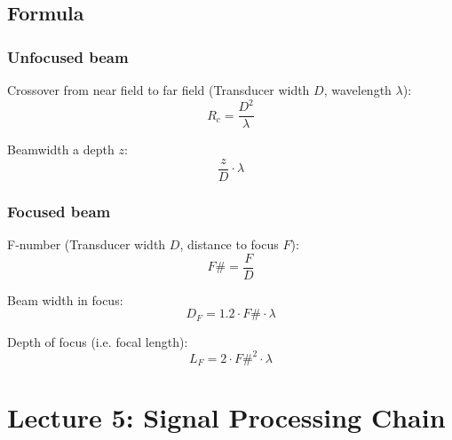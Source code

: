 \documentclass[10pt,a4paper,noendnumber=true]{scrartcl}
\begin{document}
\subsection{Formula}
\subsubsection{Unfocused beam}
Crossover from near field to far field (Transducer width $D$, wavelength $\lambda$):
\begin{equation}
R_c = \frac{D^2}{\lambda}
\end{equation}

Beamwidth a depth $z$:
\begin{equation}
\frac{z}{D}\cdot\lambda
\end{equation}

\subsubsection{Focused beam}
F-number (Transducer width $D$, distance to focus $F$):
\begin{equation}
F\# = \frac{F}{D}
\end{equation}

Beam width in focus:
\begin{equation}
D_F=1.2 \cdot F\# \cdot \lambda
\end{equation}

Depth of focus (i.e. focal length):
\begin{equation}
L_F = 2 \cdot F\#^2 \cdot \lambda
\end{equation}

\newpage
\section{Lecture 5: Signal Processing Chain}
\end{document}
